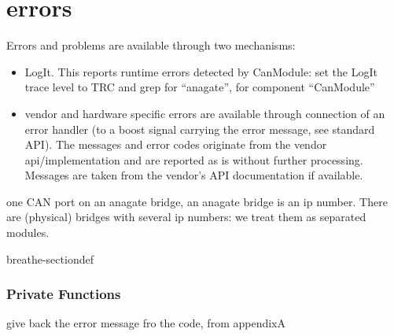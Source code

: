\documentclass[a4paper,10pt,english]{sphinxmanual}
\begin{document}
\section{errors}
\label{\detokenize{vendors/anagate:errors}}
\sphinxAtStartPar
Errors and problems are available through two mechanisms:
\begin{itemize}
\item {} 
\sphinxAtStartPar
LogIt. This reports runtime errors detected by CanModule:
set the LogIt trace level to TRC and grep for “anagate”, for component “CanModule”

\item {} 
\sphinxAtStartPar
vendor and hardware specific errors are available through connection of
an error handler (to a boost signal carrying the error message, see standard API).
The messages and error codes originate from the vendor api/implementation and are
reported as is without further processing. Messages are taken from the vendor’s API
documentation if available.

\end{itemize}

\begin{fulllineitems}
%
\pysigstartmultiline
{}%
\pysigstopmultiline
\sphinxAtStartPar
one CAN port on an anagate bridge, an anagate bridge is an ip number. There are (physical) bridges with several ip numbers: we treat them as separated modules. 

\begin{sphinxuseclass}{breathe-sectiondef}\subsubsection*{Private Functions}

\begin{fulllineitems}
\label{\detokenize{vendors/anagate:_CPPv4N10AnaCanScan19ana_canGetErrorTextEl}}%
\pysigstartmultiline
{}%
\pysigstopmultiline
\sphinxAtStartPar
give back the error message fro the code, from appendixA 

\end{fulllineitems}


\end{sphinxuseclass}
\end{fulllineitems}
\end{document}
